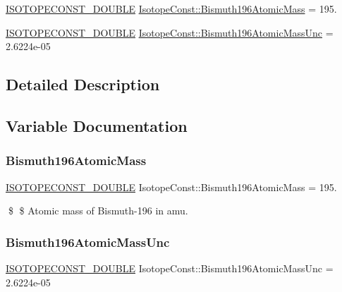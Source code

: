 \begin{DoxyCompactItemize}
\item 
\mbox{\hyperlink{group___isotope_const-_macros_ga8f45a7272ce02c0b4c65c44636ed719a}{I\+S\+O\+T\+O\+P\+E\+C\+O\+N\+S\+T\+\_\+\+D\+O\+U\+B\+LE}} \mbox{\hyperlink{group___isotope_const-_bismuth-_bi196_gacf67129aa9d638571171b26f744e6394}{Isotope\+Const\+::\+Bismuth196\+Atomic\+Mass}} = 195.
\item 
\mbox{\hyperlink{group___isotope_const-_macros_ga8f45a7272ce02c0b4c65c44636ed719a}{I\+S\+O\+T\+O\+P\+E\+C\+O\+N\+S\+T\+\_\+\+D\+O\+U\+B\+LE}} \mbox{\hyperlink{group___isotope_const-_bismuth-_bi196_ga7bff3ce5879e969b47b7308ec1f3566c}{Isotope\+Const\+::\+Bismuth196\+Atomic\+Mass\+Unc}} = 2.\+6224e-\/05
\end{DoxyCompactItemize}


\subsection{Detailed Description}


\subsection{Variable Documentation}
\mbox{\label{group___isotope_const-_bismuth-_bi196_gacf67129aa9d638571171b26f744e6394}} 
\subsubsection{\texorpdfstring{Bismuth196\+Atomic\+Mass}{Bismuth196AtomicMass}}
{\footnotesize\ttfamily \mbox{\hyperlink{group___isotope_const-_macros_ga8f45a7272ce02c0b4c65c44636ed719a}{I\+S\+O\+T\+O\+P\+E\+C\+O\+N\+S\+T\+\_\+\+D\+O\+U\+B\+LE}} Isotope\+Const\+::\+Bismuth196\+Atomic\+Mass = 195.}

\$ \$ Atomic mass of Bismuth-\/196 in amu. \mbox{\label{group___isotope_const-_bismuth-_bi196_ga7bff3ce5879e969b47b7308ec1f3566c}} 
\subsubsection{\texorpdfstring{Bismuth196\+Atomic\+Mass\+Unc}{Bismuth196AtomicMassUnc}}
{\footnotesize\ttfamily \mbox{\hyperlink{group___isotope_const-_macros_ga8f45a7272ce02c0b4c65c44636ed719a}{I\+S\+O\+T\+O\+P\+E\+C\+O\+N\+S\+T\+\_\+\+D\+O\+U\+B\+LE}} Isotope\+Const\+::\+Bismuth196\+Atomic\+Mass\+Unc = 2.\+6224e-\/05}

